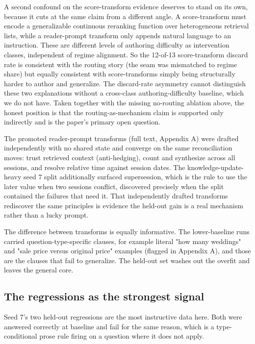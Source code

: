 A second confound on the score-transform evidence deserves to stand on its own, because it cuts at the same claim from a different angle. A score-transform must encode a generalizable continuous reranking function over heterogeneous retrieval lists, while a reader-prompt transform only appends natural language to an instruction. These are different levels of authoring difficulty as intervention classes, independent of regime alignment. So the 12-of-13 score-transform discard rate is consistent with the routing story (the seam was mismatched to regime share) but equally consistent with score-transforms simply being structurally harder to author and generalize. The discard-rate asymmetry cannot distinguish these two explanations without a cross-class authoring-difficulty baseline, which we do not have. Taken together with the missing no-routing ablation above, the honest position is that the routing-as-mechanism claim is supported only indirectly and is the paper's primary open question.

The promoted reader-prompt transforms (full text, Appendix A) were drafted independently with no shared state and converge on the same reconciliation moves: trust retrieved context (anti-hedging), count and synthesize across all sessions, and resolve relative time against session dates. The knowledge-update-heavy seed 7 split additionally surfaced supersession, which is the rule to use the later value when two sessions conflict, discovered precisely when the split contained the failures that need it. That independently drafted transforms rediscover the same principles is evidence the held-out gain is a real mechanism rather than a lucky prompt.

The difference between transforms is equally informative. The lower-baseline runs carried question-type-specific clauses, for example literal "how many weddings" and "sale price versus original price" examples (flagged in Appendix A), and those are the clauses that fail to generalize. The held-out set washes out the overfit and leaves the general core.

\subsection{The regressions as the strongest signal}

Seed 7's two held-out regressions are the most instructive data here. Both were answered correctly at baseline and fail for the same reason, which is a type-conditional prose rule firing on a question where it does not apply.

